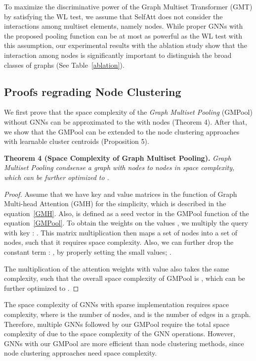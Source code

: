 To maximize the discriminative power of the Graph Multiset Transformer (GMT) by satisfying the WL test, we assume that SelfAtt does not consider the interactions among multiset elements, namely nodes. While proper GNNs with the proposed pooling function can be at most as powerful as the WL test with this assumption, our experimental results with the ablation study show that the interaction among nodes is significantly important to distinguish the broad classes of graphs (See Table~\ref{ablation}).


\subsection{Proofs regrading Node Clustering \label{appendix/clusterproof}}
We first prove that the space complexity of the \emph{Graph Multiset Pooling} (GMPool) without GNNs can be approximated to the  with  nodes (Theorem 4). After that, we show that the GMPool can be extended to the node clustering approaches with learnable cluster centroids (Proposition 5).


\textbf{Theorem 4 (Space Complexity of Graph Multiset Pooling).} \emph{Graph Multiset Pooling condsense a graph with  nodes to  nodes in  space complexity, which can be further optimized to .}

\begin{proof}
Assume that we have key  and value  matrices in the  function of Graph Multi-head Attention (GMH) for the simplicity, which is described in the equation~\ref{GMH}. Also,  is defined as a seed vector  in the GMPool function of the equation~\ref{GMPool}. To obtain the weights on the values , we multiply the query  with key : . This matrix multiplication then maps a set of  nodes into a set of  nodes, such that it requires  space complexity. Also, we can further drop the constant term : , by properly setting the small  values; .

The multiplication of the attention weights  with value  also takes the same complexity, such that the overall space complexity of GMPool is , which can be further optimized to .
\end{proof}

The space complexity of GNNs with sparse implementation requires  space complexity, where  is the number of nodes, and  is the number of edges in a graph. Therefore, multiple GNNs followed by our GMPool require the total space complexity of  due to the space complexity of the GNN operations. However, GNNs with our GMPool are more efficient than node clustering methods, since node clustering approaches need  space complexity.

